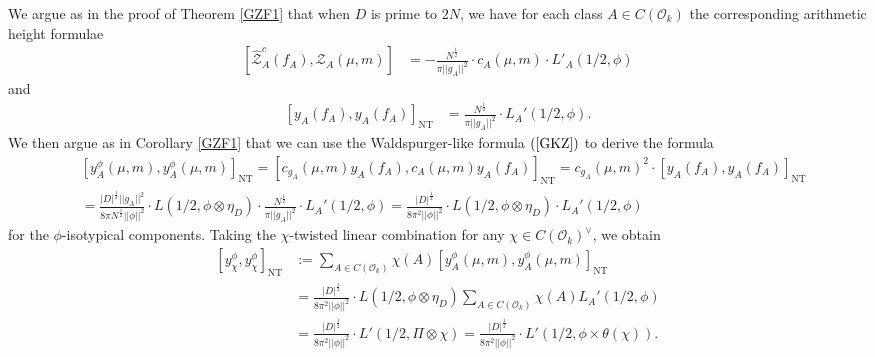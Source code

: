 \documentclass{amsart}
\theoremstyle{definition}
\theoremstyle{definition}
\theoremstyle{definition}
\begin{document}
We argue as in the proof of Theorem \ref{GZF1} that when $D$ is prime to $2N$, 
we have for each class $A \in C(\mathcal{O}_k)$ the corresponding arithmetic height formulae 
\begin{align*} \left[ \widehat{\mathcal{Z}}_A^c(f_A), \mathcal{Z}_A(\mu, m) \right] 
&= - \frac{ N^{\frac{1}{2}} }{  \pi \vert \vert g_A \vert \vert^2} \cdot c_{A}(\mu, m) \cdot L'_A(1/2, \phi) \end{align*}
and 
\begin{align*} \left[  y_A(f_A), y_A(f_A) \right]_{\operatorname{NT}} 
&= \frac{N^{\frac{1}{2}}}{ \pi \vert \vert g_A \vert \vert^2} \cdot L_A'(1/2, \phi). \end{align*}
We then argue as in Corollary \ref{GZF1} that we can use the Waldspurger-like formula $(\ref{GKZ})$ to derive the formula
\begin{equation}\begin{aligned}\label{GZF1A} &\left[ y_A^{\phi}(\mu, m), y_A^{\phi}(\mu, m)\right]_{\operatorname{NT}} 
= \left[ c_{g_A}(\mu, m) y_A(f_A), c_{A}(\mu, m) y_A(f_A) \right]_{\operatorname{NT}} 
= c_{g_A}(\mu, m)^2 \cdot \left[ y_A(f_A), y_A(f_A) \right]_{\operatorname{NT}} \\
&= \frac{  \vert D \vert^{\frac{1}{2}} \vert \vert g_A \vert \vert^2 }{ 8 \pi N^{\frac{1}{2}} \vert \vert \phi \vert \vert^2  } \cdot L(1/2, \phi \otimes \eta_D) \cdot
\frac{ N^{\frac{1}{2}} }{  \pi \vert \vert g_A \vert \vert^2 } \cdot L_A'(1/2, \phi) 
= \frac{ \vert D \vert^{\frac{1}{2}} }{ 8 \pi^2 \vert \vert \phi \vert \vert^2 } \cdot L(1/2, \phi \otimes \eta_D) \cdot L_A'(1/2, \phi)\end{aligned}\end{equation}
for the $\phi$-isotypical components.
Taking the $\chi$-twisted linear combination for any $\chi \in C(\mathcal{O}_k)^{\vee}$, we obtain
\begin{equation}\begin{aligned}\label{chi} \left[ y_{\chi}^{\phi}, y_{\chi}^{\phi} \right]_{\operatorname{NT}} 
&:= \sum\limits_{A \in C(\mathcal{O}_k)} \chi(A) \left[ y_A^{\phi}(\mu, m), y_A^{\phi}(\mu, m)\right]_{\operatorname{NT}} \\
&= \frac{ \vert D \vert^{\frac{1}{2}} }{ 8 \pi^2 \vert \vert \phi \vert \vert^2 } 
\cdot L(1/2, \phi \otimes \eta_D) \sum\limits_{A \in C(\mathcal{O}_k)} \chi(A)  L_A'(1/2, \phi) \\
&= \frac{ \vert D \vert^{\frac{1}{2}} }{ 8 \pi^2 \vert \vert \phi \vert \vert^2 } \cdot L'(1/2, \Pi \otimes \chi) 
= \frac{ \vert D \vert^{\frac{1}{2}} }{ 8 \pi^2 \vert \vert \phi \vert \vert^2 } \cdot L'(1/2, \phi \times \theta(\chi)).\end{aligned}\end{equation}
    
\end{document}
